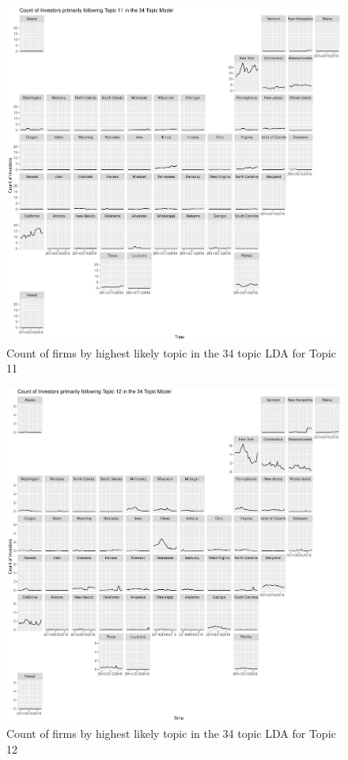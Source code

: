 		\begin{figure}
		\centering
		\includegraphics[width=1\linewidth]{Figures/ChapterV/USA_34_Topic11.pdf}
		\caption[Count of Firms for Topic 11 by Quarter]{Count of firms by highest likely topic in the 34 topic LDA for Topic 11}
		\label{fig:StateLDA11}
	\end{figure}
	
		\begin{figure}
		\centering
		\includegraphics[width=1\linewidth]{Figures/ChapterV/USA_34_Topic12.pdf}
		\caption[Count of Firms for Topic 12 by Quarter]{Count of firms by highest likely topic in the 34 topic LDA for Topic 12}
		\label{fig:StateLDA12}
	\end{figure}
	
